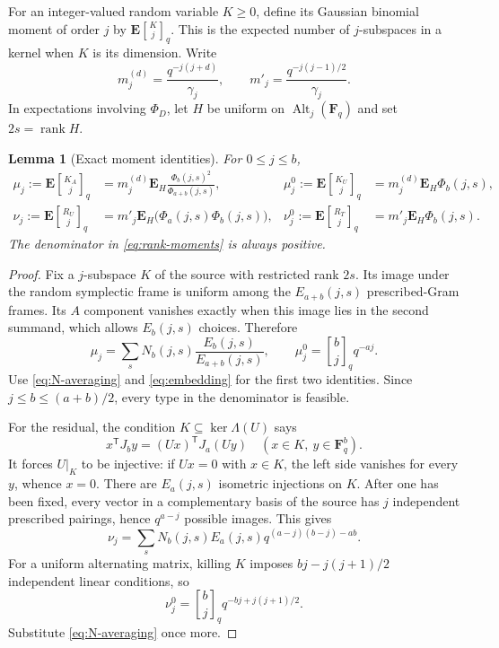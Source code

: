 \documentclass[11pt,letterpaper]{article}
\newtheorem{lemma}[theorem]{Lemma}
\theoremstyle{remark}
\newcommand{\F}{\mathbf F}
\newcommand{\E}{\mathbf E}
\newcommand{\Alt}{\operatorname{Alt}}
\newcommand{\rank}{\operatorname{rank}}
\newcommand{\qb}[2]{\genfrac{[}{]}{0pt}{}{#1}{#2}_{q}}
\begin{document}
For an integer-valued random variable $K\ge0$, define its Gaussian binomial
moment of order $j$ by $\E\qb Kj$. This is the expected number of
$j$-subspaces in a kernel when $K$ is its dimension. Write
\[
 m_j^{(d)}=\frac{q^{-j(j+d)}}{\gamma_j},\qquad
 m'_j=\frac{q^{-j(j-1)/2}}{\gamma_j}.
\]
In expectations involving $\Phi_D$, let $H$ be uniform on
$\Alt_j(\F_q)$ and set $2s=\rank H$.

\begin{lemma}[Exact moment identities]\label{lem:moments}
For $0\le j\le b$,
\begin{align}
 \mu_j:=\E\qb{K_A}j
   &=m_j^{(d)}\E_H\frac{\Phi_b(j,s)^2}{\Phi_{a+b}(j,s)},
 &\mu_j^0:=\E\qb{K_U}j
   &=m_j^{(d)}\E_H\Phi_b(j,s),\label{eq:rank-moments}\\
 \nu_j:=\E\qb{R_U}j
   &=m'_j\E_H\bigl(\Phi_a(j,s)\Phi_b(j,s)\bigr),
 &\nu_j^0:=\E\qb{R_T}j
   &=m'_j\E_H\Phi_b(j,s).\label{eq:defect-moments}
\end{align}
The denominator in \eqref{eq:rank-moments} is always positive.
\end{lemma}

\begin{proof}
Fix a $j$-subspace $K$ of the source with restricted rank $2s$. Its image
under the random symplectic frame is uniform among the
$E_{a+b}(j,s)$ prescribed-Gram frames. Its $A$ component vanishes exactly
when this image lies in the second summand, which allows $E_b(j,s)$ choices.
Therefore
\[
 \mu_j=\sum_s N_b(j,s)\frac{E_b(j,s)}{E_{a+b}(j,s)},\qquad
 \mu_j^0=\qb bjq^{-aj}.
\]
Use \eqref{eq:N-averaging} and \eqref{eq:embedding} for the first two
identities. Since $j\le b\le(a+b)/2$, every type in the denominator is
feasible.

For the residual, the condition $K\subseteq\ker\Lambda(U)$ says
\[
 x^{\mathsf T}J_by=(Ux)^{\mathsf T}J_a(Uy)
                \quad(x\in K,\ y\in\F_q^b).
\]
It forces $U|_K$ to be injective: if $Ux=0$ with $x\in K$, the left side
vanishes for every $y$, whence $x=0$. There are $E_a(j,s)$ isometric
injections on $K$. After one has been fixed, every vector in a complementary
basis of the source has $j$ independent prescribed pairings, hence
$q^{a-j}$ possible images. This gives
\[
 \nu_j=\sum_s N_b(j,s)E_a(j,s)
                         q^{(a-j)(b-j)-ab}.
\]
For a uniform alternating matrix, killing $K$ imposes
$bj-j(j+1)/2$ independent linear conditions, so
\[
 \nu_j^0=\qb bj q^{-bj+j(j+1)/2}.
\]
Substitute \eqref{eq:N-averaging} once more.
\end{proof}
\end{document}

